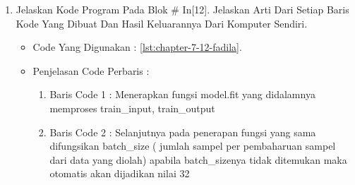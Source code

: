 \begin{enumerate}
\begin{itemize}
\par
\par
\item Penjelasan Code Perbaris	: 
\begin{enumerate}
\item Baris Code 1	: Memasukkan / Mengimport library keras.callbacks dimana digunakan dalam penulisan log untuk TensorBoard, yang memungkinkan untuk memvisualisasikan grafik dinamis dari pelatihan dan metrik pengujian.
\item Baris Code 2	: Membuat variabel tenserboard yang mendefinisikan fungsi TensorBoard pada keras.callbacks yang digunakan sebagai alat visualisasi yang disediakan dengan TensorFlow. Kemudian untuk fungsi log\_dir (jalur direktori tempat menyimpan file log yang akan diuraikan oleh TensorBoard) memanggil data yaitu './logs/mnist-style'
\end{enumerate}
\par
\item Hasil : \ref{chapter-7-in-11-fadila}
\par
\par
\begin{figure}[!hbtp]
\centering
\texttt{[image: figures/chapter-7-in-11-fadila.jpg]}
\caption{Code Program Pada In [11] - fadila}
\label{chapter-7-in-11-fadila}
\end{figure}
\par
\par
\end{itemize}
\par
\par
\par
\item Jelaskan Kode Program Pada Blok \# In[12]. Jelaskan Arti Dari Setiap Baris Kode Yang Dibuat Dan Hasil Keluarannya Dari Komputer Sendiri.
\begin{itemize}
\item Code Yang Digunakan : \ref{lst:chapter-7-12-fadila}.

\par
\par
\item Penjelasan Code Perbaris	: 
\begin{enumerate}
\item Baris Code 1	: Menerapkan fungsi model.fit yang didalamnya memproses train\_input, train\_output
\item Baris Code 2	: Selanjutnya pada penerapan fungsi yang sama difungsikan batch\_size ( jumlah sampel per pembaharuan sampel dari data yang diolah) apabila batch\_sizenya tidak ditemukan maka otomatis akan dijadikan nilai 32

\end{enumerate}
\end{itemize}
\end{enumerate}
